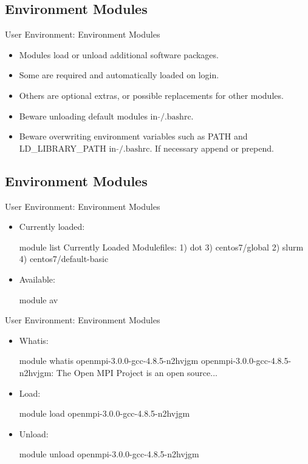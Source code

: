 \subsection{Environment Modules}
\begin{frame}[fragile]{User Environment: Environment Modules}
\begin{itemize}
\item{Modules load or unload additional software packages.}
\item{Some are \alert{required} and automatically loaded on login.}
\item{Others are optional extras, or possible replacements for other modules.}
\item{\alert{Beware} unloading default modules in $\tilde{}\text{/.bashrc}$.}
\item{\alert{Beware} overwriting environment variables such as PATH and LD\_LIBRARY\_PATH in $\tilde{}\text{/.bashrc}$. If necessary append or prepend.}
\end{itemize}
\end{frame}

\subsection{Environment Modules}
\begin{frame}[fragile]{User Environment: Environment Modules}
\begin{itemize}
\item{Currently loaded:}
\begin{semiverbatim}
\scriptsize
module list
Currently Loaded Modulefiles:
  1) dot                     3) centos7/global
  2) slurm                   4) centos7/default-basic
\end{semiverbatim}
\medskip
\item{Available:}
\begin{semiverbatim}
\scriptsize
module av
\end{semiverbatim}
\end{itemize}
\end{frame}

\begin{frame}[fragile]{User Environment: Environment Modules}
\begin{itemize}
\item{Whatis:}
\begin{semiverbatim}
\tiny
module whatis openmpi-3.0.0-gcc-4.8.5-n2hvjgm
openmpi-3.0.0-gcc-4.8.5-n2hvjgm: The Open MPI Project is an open source...
\end{semiverbatim}
\medskip
\item{Load:}
\begin{semiverbatim}
\scriptsize
module load openmpi-3.0.0-gcc-4.8.5-n2hvjgm
\end{semiverbatim}
\medskip
\item{Unload:}
\begin{semiverbatim}
\scriptsize
module unload openmpi-3.0.0-gcc-4.8.5-n2hvjgm
\end{semiverbatim}
\end{itemize}
\end{frame}


